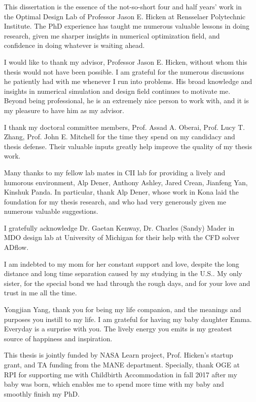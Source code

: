  
 
This dissertation is the essence of the not-so-short four and half years' work in the Optimal Design Lab of Professor Jason E. Hicken at Rensselaer Polytechnic Institute.  The PhD experience has taught me numerous valuable lessons in doing research,  given me sharper insights in numerical optimization field, and confidence in doing whatever is waiting ahead.  

I would like to thank my advisor, Professor Jason E. Hicken, without whom this thesis would not have been possible. I am grateful for the numerous discussions he patiently had with me whenever I run into problems. His broad knowledge and insights in numerical simulation and design field continues to motivate me.  Beyond being professional, he is an extremely nice person to work with, and it is my pleasure to have him as my advisor. 

I thank my doctoral committee members, Prof. Assad A. Oberai, Prof. Lucy T. Zhang, Prof. John E. Mitchell for the time they spend on my candidacy and thesis defense. Their valuable inputs greatly help improve the quality of my thesis work. 

Many thanks to my fellow lab mates in CII lab for providing a lively and humorous environment, Alp Dener, Anthony Ashley,  Jared Crean, Jianfeng Yan, Kinshuk Panda. In particular, thank Alp Dener, whose work in Kona laid the foundation for my thesis research, and who had very generously given me numerous valuable suggestions. 

I gratefully acknowledge Dr. Gaetan Kenway, Dr. Charles (Sandy) Mader in MDO design lab at University of Michigan for their help with the CFD solver ADflow. 

I am indebted to my mom for her constant support and love, despite the long distance and long time separation caused by my studying in the U.S.. My only sister, for the special bond we had through the rough days, and for your love and trust in me all the time. 

Yongjian Yang, thank you for being my life companion, and the meanings and purposes you instill to my life. I am grateful for having my baby daughter Emma. Everyday is a surprise with you. The lively energy you emits is my greatest source of happiness and inspiration.  

This thesis is jointly funded by NASA Learn project, Prof. Hicken's startup grant, and TA funding from the MANE department. Specially, thank OGE at RPI for supporting me with Childbirth Accommodation in fall 2017 after my baby was born, which enables me to spend more time with my baby and smoothly finish my PhD. 
